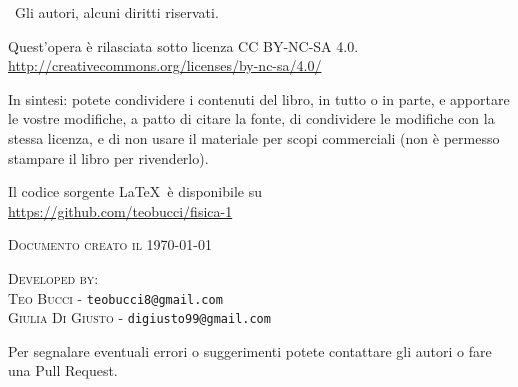 
\textcopyright \ Gli autori, alcuni diritti riservati.

Quest'opera è rilasciata sotto licenza CC BY-NC-SA 4.0.\\
\url{http://creativecommons.org/licenses/by-nc-sa/4.0/}

In sintesi: potete condividere i contenuti del libro, in tutto o in parte, e apportare le vostre modifiche, a patto di citare la fonte, di condividere le modifiche con la stessa licenza, e di non usare il materiale per scopi commerciali (non è permesso stampare il libro per rivenderlo).

Il codice sorgente \LaTeX \ è disponibile su \\
\url{https://github.com/teobucci/fisica-1}


\textsc{Documento creato il \today}


\textsc{Developed by:}\\
\textsc{Teo Bucci} - \texttt{teobucci8@gmail.com}\\
\textsc{Giulia Di Giusto} - \texttt{digiusto99@gmail.com}

Per segnalare eventuali errori o suggerimenti potete contattare gli autori o fare una Pull Request.

